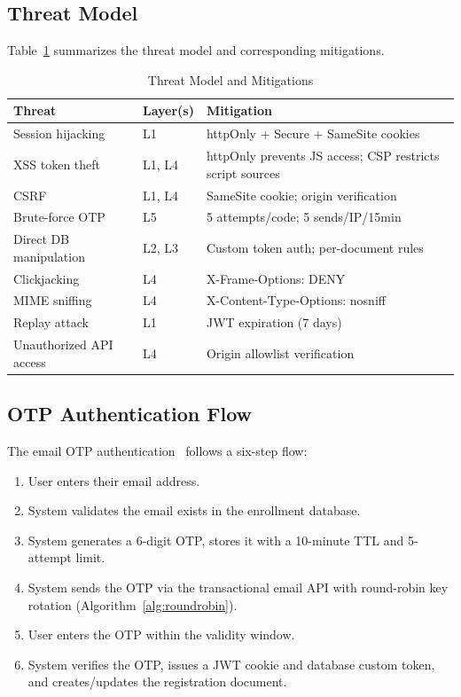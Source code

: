 \documentclass[11pt,a4paper]{article}
\theoremstyle{plain}
\theoremstyle{definition}
\theoremstyle{remark}
\begin{document}
\subsection{Threat Model}

Table~\ref{tab:threats} summarizes the threat model and corresponding mitigations.

\begin{table}[htbp]
\centering
\caption{Threat Model and Mitigations}
\label{tab:threats}
\small
\renewcommand{\arraystretch}{1.15}
\begin{tabular}{@{}p{2.8cm}p{1.5cm}p{5cm}@{}}
\toprule
\textbf{Threat} & \textbf{Layer(s)} & \textbf{Mitigation} \\
\midrule
Session hijacking & L1 & httpOnly + Secure + SameSite cookies \\
XSS token theft & L1, L4 & httpOnly prevents JS access; CSP restricts script sources \\
CSRF & L1, L4 & SameSite cookie; origin verification \\
Brute-force OTP & L5 & 5 attempts/code; 5 sends/IP/15min \\
Direct DB manipulation & L2, L3 & Custom token auth; per-document rules \\
Clickjacking & L4 & X-Frame-Options: DENY \\
MIME sniffing & L4 & X-Content-Type-Options: nosniff \\
Replay attack & L1 & JWT expiration (7 days) \\
Unauthorized API access & L4 & Origin allowlist verification \\
\bottomrule
\end{tabular}
\end{table}

\subsection{OTP Authentication Flow}

The email OTP authentication~\cite{mraihi2011} follows a six-step flow:
\begin{enumerate}[noitemsep,topsep=3pt]
    \item User enters their email address.
    \item System validates the email exists in the enrollment database.
    \item System generates a 6-digit OTP, stores it with a 10-minute TTL and 5-attempt limit.
    \item System sends the OTP via the transactional email API with round-robin key rotation (Algorithm~\ref{alg:roundrobin}).
    \item User enters the OTP within the validity window.
    \item System verifies the OTP, issues a JWT cookie and database custom token, and creates/updates the registration document.
\end{enumerate}
\end{document}
